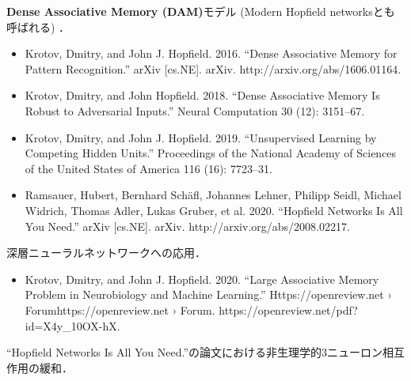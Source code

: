 \textbf{Dense Associative Memory (DAM)}モデル (Modern Hopfield networksとも呼ばれる) ．

\begin{itemize}
\item Krotov, Dmitry, and John J. Hopfield. 2016. “Dense Associative Memory for Pattern Recognition.” arXiv [cs.NE]. arXiv. http://arxiv.org/abs/1606.01164.
\item Krotov, Dmitry, and John Hopfield. 2018. “Dense Associative Memory Is Robust to Adversarial Inputs.” Neural Computation 30 (12): 3151–67.
\item Krotov, Dmitry, and John J. Hopfield. 2019. “Unsupervised Learning by Competing Hidden Units.” Proceedings of the National Academy of Sciences of the United States of America 116 (16): 7723–31.
\end{itemize}


\begin{itemize}
\item Ramsauer, Hubert, Bernhard Schäfl, Johannes Lehner, Philipp Seidl, Michael Widrich, Thomas Adler, Lukas Gruber, et al. 2020. “Hopfield Networks Is All You Need.” arXiv [cs.NE]. arXiv. http://arxiv.org/abs/2008.02217.
\end{itemize}

深層ニューラルネットワークへの応用．


\begin{itemize}
\item Krotov, Dmitry, and John J. Hopfield. 2020. “Large Associative Memory Problem in Neurobiology and Machine Learning.” Https://openreview.net › Forumhttps://openreview.net › Forum. https://openreview.net/pdf?id=X4y_10OX-hX.
\end{itemize}

“Hopfield Networks Is All You Need.”の論文における非生理学的3ニューロン相互作用の緩和．

